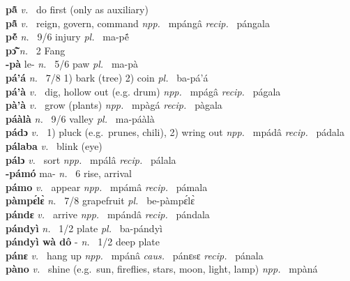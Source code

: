 \noindent
{\bfseries pã̂}  {\itshape v.~} do first (only as auxiliary)    \\ 
{\bfseries pã̂}  {\itshape v.~} reign, govern, command   {\itshape npp.~} mpángâ {\itshape recip.~} pángala  \\ 
{\bfseries pẽ́}  {\itshape n.~} 9/6 injury {\itshape pl.~} ma-pẽ́    \\ 
{\bfseries pɔ̃̂}  {\itshape n.~} 2 Fang    \\ 
{\bfseries -pà} le- {\itshape n.~} 5/6 paw {\itshape pl.~} ma-pà    \\ 
{\bfseries pá'á}  {\itshape n.~} 7/8 1) bark (tree) 2) coin {\itshape pl.~} ba-pá'á    \\ 
{\bfseries pá'à}  {\itshape v.~} dig, hollow out (e.g. drum)   {\itshape npp.~} mpágâ {\itshape recip.~} págala  \\ 
{\bfseries pà'à}  {\itshape v.~} grow (plants)   {\itshape npp.~} mpàgá {\itshape recip.~} pàgala  \\ 
{\bfseries páàlà}  {\itshape n.~} 9/6 valley {\itshape pl.~} ma-páàlà    \\ 
{\bfseries pádɔ}  {\itshape v.~} 1) pluck (e.g.\ prunes, chili), 2) wring out   {\itshape npp.~} mpádâ {\itshape recip.~} pádala  \\ 
{\bfseries pálaba}  {\itshape v.~} blink (eye)    \\ 
{\bfseries pálɔ}  {\itshape v.~} sort   {\itshape npp.~} mpálâ {\itshape recip.~} pálala  \\ 
{\bfseries -pámó} ma- {\itshape n.~} 6 rise, arrival    \\ 
{\bfseries pámo}  {\itshape v.~} appear   {\itshape npp.~} mpámâ {\itshape recip.~} pámala  \\ 
{\bfseries pàmpɛ́lɛ̀}  {\itshape n.~} 7/8 grapefruit {\itshape pl.~} be-pàmpɛ́lɛ̀    \\ 
{\bfseries pándɛ}  {\itshape v.~} arrive   {\itshape npp.~} mpándâ {\itshape recip.~} pándala  \\ 
{\bfseries pándyì}  {\itshape n.~} 1/2 plate {\itshape pl.~} ba-pándyì    \\ 
{\bfseries pándyì wà dô} - {\itshape  n.~} 1/2 deep plate    \\ 
{\bfseries pánɛ}  {\itshape v.~} hang up   {\itshape npp.~} mpánâ {\itshape caus.~} pánɛsɛ {\itshape recip.~} pánala  \\ 
{\bfseries pàno}  {\itshape v.~} shine (e.g.\ sun, fireflies, stars, moon, light, lamp)   {\itshape npp.~} mpàná  \\ 
